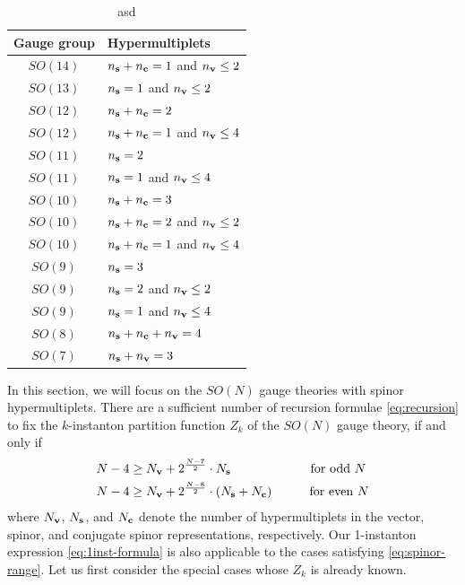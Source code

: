 \documentclass[letterpaper, 11pt]{article}
\begin{document}
{\begin{table}[t!]
  \centering
  \begin{tabular}{@{}cl@{}}
    \toprule
    Gauge group  & Hypermultiplets    \\  \midrule
    $SO(14)$  & $n_{\bf s} + n_{\bf c} = 1$ and $n_{\bf v}  \leq 2$ \\
    $SO(13)$  & $n_{\bf s} = 1$ and $n_{\bf v}  \leq 2$ \\
    $SO(12)$  & $n_{\bf s} + n_{\bf c} = 2$ \\
    $SO(12)$  & $n_{\bf s} + n_{\bf c} = 1$ and  $n_{\bf v}  \leq 4$\\
    $SO(11)$  & $n_{\bf s}= 2$ \\
    $SO(11)$  & $n_{\bf s}= 1$ and  $n_{\bf v}  \leq 4$\\
    $SO(10)$  & $n_{\bf s} + n_{\bf c} = 3$ \\
    $SO(10)$  & $n_{\bf s} + n_{\bf c} = 2$ and  $n_{\bf v}  \leq 2$\\
    $SO(10)$  & $n_{\bf s} + n_{\bf c} = 1$ and  $n_{\bf v}  \leq 4$\\
    $SO(9)$  & $n_{\bf s}  = 3$ \\
    $SO(9)$  & $n_{\bf s}  = 2$ and  $n_{\bf v}  \leq 2$\\
    $SO(9)$  & $n_{\bf s} = 1$ and  $n_{\bf v}  \leq 4$\\
    $SO(8)$  & $n_{\bf s} + n_{\bf c}+ n_{\bf v} = 4$ \\
    $SO(7)$  & $n_{\bf s} + n_{\bf v}  =3$\\ \bottomrule
    \end{tabular}
    \caption{asd}
    \label{tbl:spinor}
\end{table}

In this section, we will focus on the $SO(N)$ gauge theories with spinor hypermultiplets.
There are a sufficient number of recursion formulae \eqref{eq:recursion} to fix the $k$-instanton partition function $Z_k$ of the $SO(N)$ gauge theory, if and only if  
\begin{align}
  \label{eq:spinor-range}
  \begin{split}
  N-4 &\geq N_{\bf v} + 2^{\frac{N-7}{2}}\cdot N_{\bf s} \qquad\qquad\qquad \text{ for odd $N$}\\
  N-4 &\geq N_{\bf v} + 2^{\frac{N-8}{2}}\cdot (N_{\bf s} + N_{\bf c})\qquad\quad \text{for even $N$}
  \end{split}
\end{align}
where $N_{\bf v}$, $N_{\bf s}$, and $N_{\bf c}$  denote the number of hypermultiplets in the vector, spinor, and conjugate spinor representations, respectively. Our 1-instanton expression \eqref{eq:1inst-formula} is also applicable to the cases satisfying \eqref{eq:spinor-range}. Let us first consider the special cases whose $Z_k$ is already known.

}
\end{document}
